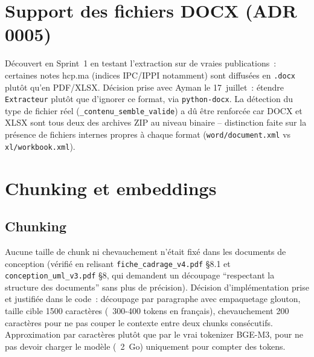 \documentclass[11pt,a4paper]{article}
\begin{document}
\section{Support des fichiers DOCX (ADR 0005)}
D\'ecouvert en Sprint~1 en testant l'extraction sur de vraies publications~: certaines notes hcp.ma (indices IPC/IPPI notamment) sont diffus\'ees en \texttt{.docx} plut\^ot qu'en PDF/XLSX. D\'ecision prise avec Ayman le 17~juillet~: \'etendre \texttt{Extracteur} plut\^ot que d'ignorer ce format, via \texttt{python-docx}. La d\'etection du type de fichier r\'eel (\texttt{\_contenu\_semble\_valide}) a d\^u \^etre renforc\'ee car DOCX et XLSX sont tous deux des archives ZIP au niveau binaire -- distinction faite sur la pr\'esence de fichiers internes propres \`a chaque format (\texttt{word/document.xml} vs \texttt{xl/workbook.xml}).

\section{Chunking et embeddings}

\subsection{Chunking}
Aucune taille de chunk ni chevauchement n'\'etait fix\'e dans les documents de conception (v\'erifi\'e en relisant \texttt{fiche\_cadrage\_v4.pdf} \S8.1 et \texttt{conception\_uml\_v3.pdf} \S8, qui demandent un d\'ecoupage ``respectant la structure des documents'' sans plus de pr\'ecision). D\'ecision d'impl\'ementation prise et justifi\'ee dans le code~: d\'ecoupage par paragraphe avec empaquetage glouton, taille cible 1500 caract\`eres (~300-400 tokens en fran\c{c}ais), chevauchement 200 caract\`eres pour ne pas couper le contexte entre deux chunks cons\'ecutifs. Approximation par caract\`eres plut\^ot que par le vrai tokenizer BGE-M3, pour ne pas devoir charger le mod\`ele (~2~Go) uniquement pour compter des tokens.
\end{document}
